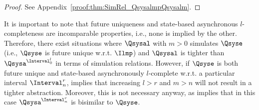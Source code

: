 \begin{proof}
 See Appendix~\ref{proof:thm:SimRel_QsysalmpQsysalm}.
\end{proof}
It is important to note that future uniqueness and state-based asynchronous $l$-completeness are incomparable properties, i.e., none is implied by the other. Therefore, there exist situations where $\Qsysal$ with $m>0$ simulates $\Qsyse$ (i.e., $\Qsyse$ is future unique w.r.t. $\Ilmp$) and $\Qsysal$ is tighter than $\Qsysa^{\Interval^l_0}$ in terms of simulation relations. However, if $\Qsyse$ is both future unique and state-based asynchronously $l$-complete w.r.t. a particular interval $\Interval^r_n$,  implies that increasing $l>r$ and $m>n$ will not result in a tighter abstraction. Moreover, this is not necessary anyway, as  implies that in this case $\Qsysa^{\Interval^r_n}$ is bisimilar to $\Qsyse$. 



